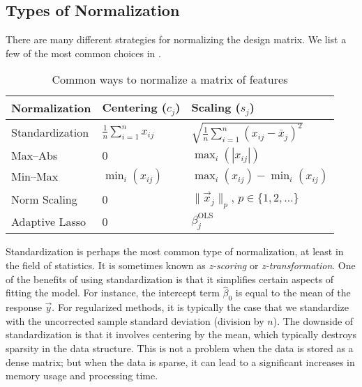 \subsection{Types of Normalization}

There are many different strategies for normalizing the design matrix. We list a few of the
most common choices in .

\begin{table}[hbt]
  \centering
  \caption{Common ways to normalize a matrix of features}
  \label{tab:normalization-types}
  \begin{tabular}{lll}
    \toprule
    Normalization   & Centering (\(c_{j}\))              & Scaling (\(s_j\))                                         \\
    \midrule
    Standardization & \(\frac{1}{n}\sum_{i=1}^n x_{ij}\) & \(\sqrt{\frac{1}{n}\sum_{i=1}^n (x_{ij} - \bar{x}_j)^2}\) \\
    \addlinespace
    Max--Abs        & 0                                  & \(\max_i(|x_{ij}|)\)                                      \\
    \addlinespace
    Min--Max        & \(\min_i(x_{ij})\)                 & \(\max_i(x_{ij}) - \min_i(x_{ij})\)                       \\
    \addlinespace
    Norm Scaling    & 0                                  & \(\lVert \vec{x}_j\rVert_p\), \(p \in \{1,2,\dots\}\)     \\
    \addlinespace
    Adaptive Lasso  & 0                                  & \(\beta_j^\text{OLS}\)                                    \\
    \bottomrule
  \end{tabular}
\end{table}

Standardization is perhaps the most common type of normalization, at least in the field of
statistics. It is sometimes known as \emph{z-scoring} or \emph{z-transformation}. One of
the benefits of using standardization is that it simplifies certain aspects of fitting the
model. For instance, the intercept term \(\hat\beta_0\) is equal to the mean of the
response \(\vec y\). For regularized methods, it is typically the case that we standardize
with the uncorrected sample standard deviation (division by \(n\)). The downside of
standardization is that it involves centering by the mean, which typically destroys
sparsity in the data structure. This is not a problem when the data is stored as a dense
matrix; but when the data is sparse, it can lead to a significant increases in memory usage
and processing time.

